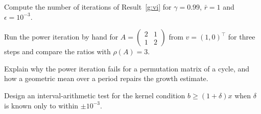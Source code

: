 \begin{exercise}
Compute the number of iterations of Result~\ref{g:vi} for $\gamma=0.99$, $\bar r=1$ and $\epsilon=10^{-3}$.
\end{exercise}
\begin{exercise}
Run the power iteration by hand for $A=\begin{pmatrix}2&1\\1&2\end{pmatrix}$ from $v=(1,0)^\top$ for three steps and compare the ratios with $\rho(A)=3$.
\end{exercise}
\begin{exercise}
Explain why the power iteration fails for a permutation matrix of a cycle, and how a geometric mean over a period repairs the growth estimate.
\end{exercise}
\begin{exercise}
Design an interval-arithmetic test for the kernel condition $b\ge(1+\delta)x$ when $\delta$ is known only to within $\pm10^{-3}$.
\end{exercise}
